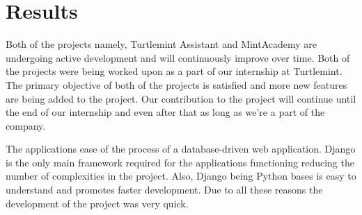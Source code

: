 \chapter{Results}
Both of the projects namely, Turtlemint Assistant and MintAcademy are
undergoing active development and will continuously improve over time. Both of
the projects were being worked upon as a part of our internship at Turtlemint.
The primary objective of both of the projects is satisfied and more new
features are being added to the project. Our contribution to the project will
continue until the end of our internship and even after that as long as we're
a part of the company.

The applications ease of the process of a database-driven web application.
Django is the only main framework required for the applications functioning
reducing the number of complexities in the project. Also, Django being Python
bases is easy to understand and promotes faster development. Due to all these
reasons the development of the project was very quick.
